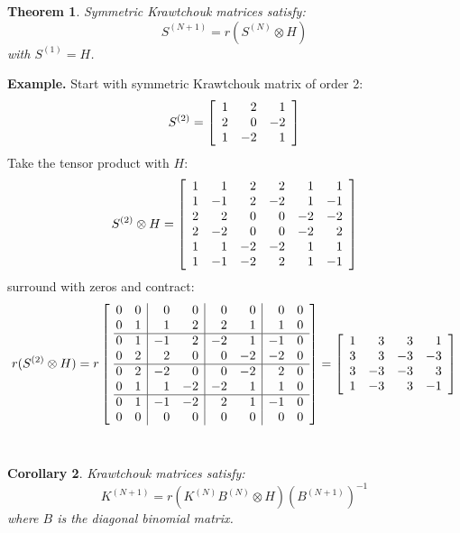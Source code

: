 \documentclass[12pt]{article}
\newtheorem{theorem}{Theorem}[section]       %
\newtheorem{corollary}[theorem]{Corollary}
\def\KM{K}
\numberwithin{equation}{section}
\begin{document}
\begin{theorem}
Symmetric Krawtchouk matrices satisfy:
$$
S^{(N+1)} = r ( S^{(N)}\otimes H )
$$
with $S^{(1)}=H$.
\end{theorem}

\noindent
{\bf Example. }  Start with symmetric Krawtchouk matrix of order 2:
$$
S^{(2)} = 
\left[ \begin{array}{rrr}   
                  1 & 2 & 1 \cr
                  2 & 0 & -2 \cr
                  1 & -2& 1  \cr\end{array} \right]
$$
Take the tensor product with $H$:
$$
S^{(2)}\otimes H = 
\left[ \begin{array}{rrrrrr}   
                  1&1 & 2&2 & 1&1 \cr
                  1&-1 & 2&-2 & 1&-1 \cr
                  2&2 & 0&0 & -2&-2 \cr
                  2&-2 & 0&0 & -2&2 \cr
                  1&1 & -2&-2& 1&1  \cr
                  1&-1 & -2&2& 1&-1  \cr\end{array} \right]
$$
surround with zeros and contract:                
$$
r (S^{(2)}\otimes H) = r
\left[ \begin{array}{rr|rr|rr|rr} 
                0& 0& 0& 0& 0&  0&   0 &0 \cr 
                0& 1& 1& 2& 2 & 1&   1 &0 \cr
                \multispan{8} \hrulefill\cr
                0& 1&-1&2&  -2 & 1& -1&0  \cr
                0& 2&2 &  0&0 & -2& -2 &0 \cr
                \multispan{8} \hrulefill\cr                
                0& 2&-2 & 0&0 & -2& 2 &0  \cr
                0& 1&1 & -2&-2& 1&  1  &0 \cr
                \multispan{8} \hrulefill\cr               
                0& 1&-1 &-2&2& 1&   -1 &0  \cr
                0& 0& 0&0&  0& 0&   0 &0 \cr \end{array}\right]
%
=
\left[ \begin{array} {rrrr}
                1& 3&  3& 1 \cr 
                3& 3& -3& -3 \cr
                3& -3& -3& 3 \cr
                1&-3&  3& -1 \cr\end{array} \right]
$$
~
\\
\begin{corollary}
Krawtchouk matrices satisfy:
$$
\KM^{(N+1)} = r ( \KM^{(N)} B^{(N)} \otimes H ) (B^{(N+1)})^{-1}
$$
where $B$ is the diagonal binomial matrix.
\end{corollary}
\end{document}

